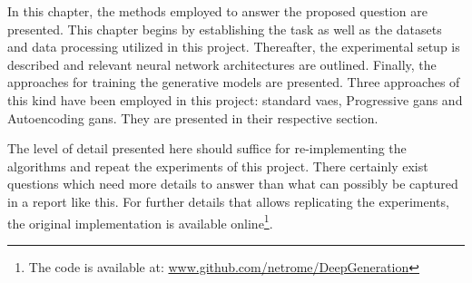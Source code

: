 In this chapter, the methods employed to answer the proposed question are presented. This chapter begins by establishing the task as well as the datasets and data processing utilized in this project. Thereafter, the experimental setup is described and relevant neural network architectures are outlined. Finally, the approaches for training the generative models are presented. Three approaches of this kind have been employed in this project: standard \acrfull{vaes}, Progressive \acrfull{gans} and Autoencoding \acrfull{gans}. They are presented in their respective section. 

The level of detail presented here should suffice for re-implementing the algorithms and repeat the experiments of this project. There certainly exist questions which need more details to answer than what can possibly be captured in a report like this. For further details that allows replicating the experiments, the original implementation is available online\footnote{The code is available at: \url{www.github.com/netrome/DeepGeneration}}.

